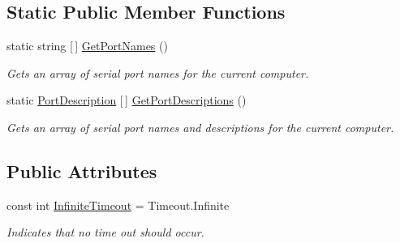 \subsection*{Static Public Member Functions}
\begin{DoxyCompactItemize}
\item 
static string \mbox{[}$\,$\mbox{]} \mbox{\hyperlink{class_r_j_c_p_1_1_i_o_1_1_ports_1_1_serial_port_stream_a2f188e6437adb4c64ce434f7b0c5e4ef}{Get\+Port\+Names}} ()
\begin{DoxyCompactList}\small\item\em Gets an array of serial port names for the current computer. \end{DoxyCompactList}\item 
static \mbox{\hyperlink{class_r_j_c_p_1_1_i_o_1_1_ports_1_1_port_description}{Port\+Description}} \mbox{[}$\,$\mbox{]} \mbox{\hyperlink{class_r_j_c_p_1_1_i_o_1_1_ports_1_1_serial_port_stream_a5f5f2fe99ac4c0b523534608cf920ead}{Get\+Port\+Descriptions}} ()
\begin{DoxyCompactList}\small\item\em Gets an array of serial port names and descriptions for the current computer. \end{DoxyCompactList}\end{DoxyCompactItemize}
\subsection*{Public Attributes}
\begin{DoxyCompactItemize}
\item 
const int \mbox{\hyperlink{class_r_j_c_p_1_1_i_o_1_1_ports_1_1_serial_port_stream_aa6e7a33a67aa13f5dd0ef9258dc9f6aa}{Infinite\+Timeout}} = Timeout.\+Infinite
\begin{DoxyCompactList}\small\item\em Indicates that no time out should occur. \end{DoxyCompactList}\end{DoxyCompactItemize}
